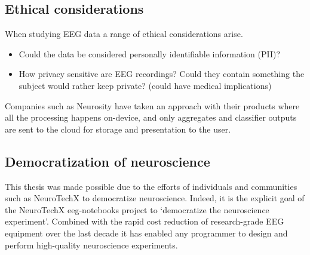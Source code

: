 \subsection{Ethical considerations}

    When studying EEG data a range of ethical considerations arise. 

    \begin{itemize}
        \item Could the data be considered personally identifiable information (PII)? 
        \item How privacy sensitive are EEG recordings? Could they contain something the subject would rather keep private? (could have medical implications)
    \end{itemize}

    Companies such as Neurosity have taken an approach with their products where all the processing happens on-device, and only aggregates and classifier outputs are sent to the cloud for storage and presentation to the user.



\subsection{Democratization of neuroscience}


    This thesis was made possible due to the efforts of individuals and communities such as NeuroTechX to democratize neuroscience. Indeed, it is the explicit goal of the NeuroTechX eeg-notebooks project to `democratize the neuroscience experiment'. Combined with the rapid cost reduction of research-grade EEG equipment over the last decade it has enabled any programmer to design and perform high-quality neuroscience experiments.


